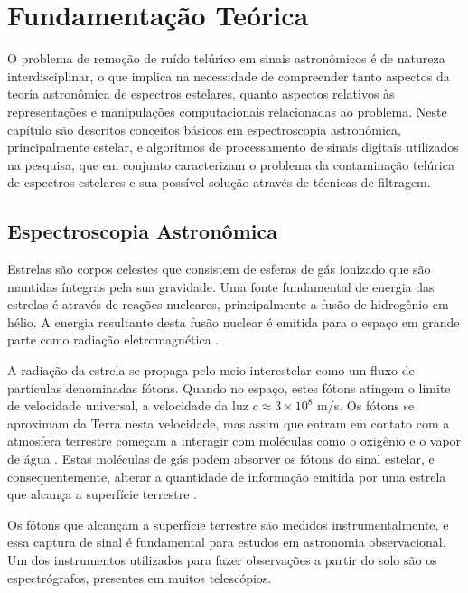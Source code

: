 \chapter{Fundamentação Teórica}
\label{cap:fundamentacao-teorica}

O problema de remoção de ruído telúrico em sinais astronômicos é de natureza interdisciplinar, o que implica na necessidade de compreender tanto aspectos da teoria astronômica de espectros estelares, quanto aspectos relativos às representações e manipulações computacionais relacionadas ao problema.
Neste capítulo são descritos conceitos básicos em espectroscopia astronômica, principalmente estelar, e algoritmos de processamento de sinais digitais utilizados na pesquisa, que em conjunto caracterizam o problema da contaminação telúrica de espectros estelares e sua possível solução através de técnicas de filtragem.

\section{Espectroscopia Astronômica} \label{astronomic-spectroscopy}

Estrelas são corpos celestes que consistem de esferas de gás ionizado que são mantidas íntegras pela sua gravidade. Uma fonte fundamental de energia das estrelas é através de reações nucleares, principalmente a fusão de hidrogênio em hélio. A energia resultante desta fusão nuclear é emitida para o espaço em grande parte como radiação eletromagnética \citep{estrelas-ufrgs}.   

A radiação da estrela se propaga pelo meio interestelar como um fluxo de partículas denominadas fótons. Quando no espaço, estes fótons atingem o limite de velocidade universal, a velocidade da luz $\textit{c} \approx 3 \times 10^8$ m/s. Os fótons se aproximam da Terra nesta velocidade, mas assim que entram em contato com a atmosfera terrestre começam a interagir com moléculas como o oxigênio e o vapor de água \citep{wiki:photon}. Estas moléculas de gás podem absorver os fótons do sinal estelar, e consequentemente, alterar a quantidade de informação emitida por uma estrela que alcança a superfície terrestre \citep{wiki:telluric-contamination}.

Os fótons que alcançam a superfície terrestre são medidos instrumentalmente, e essa captura de sinal é fundamental para estudos em astronomia observacional. Um dos instrumentos utilizados para fazer observações a partir do solo são os espectrógrafos, presentes em muitos telescópios. 

